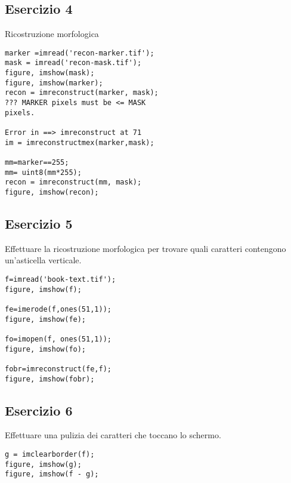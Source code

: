\subsection{Esercizio 4}
Ricostruzione morfologica
\begin{lstlisting}
marker =imread('recon-marker.tif');
mask = imread('recon-mask.tif');
figure, imshow(mask);
figure, imshow(marker);
recon = imreconstruct(marker, mask);
??? MARKER pixels must be <= MASK
pixels.

Error in ==> imreconstruct at 71
im = imreconstructmex(marker,mask);

mm=marker==255;
mm= uint8(mm*255);
recon = imreconstruct(mm, mask);
figure, imshow(recon);
\end{lstlisting}


\subsection{Esercizio 5}
Effettuare la ricostruzione morfologica per trovare quali caratteri contengono un'asticella verticale.
\begin{lstlisting}
f=imread('book-text.tif');
figure, imshow(f);

fe=imerode(f,ones(51,1));
figure, imshow(fe);

fo=imopen(f, ones(51,1));
figure, imshow(fo);

fobr=imreconstruct(fe,f);
figure, imshow(fobr);
\end{lstlisting}


\subsection{Esercizio 6}
Effettuare una pulizia dei caratteri che toccano lo schermo.
\begin{lstlisting}
g = imclearborder(f);
figure, imshow(g);
figure, imshow(f - g);
\end{lstlisting}